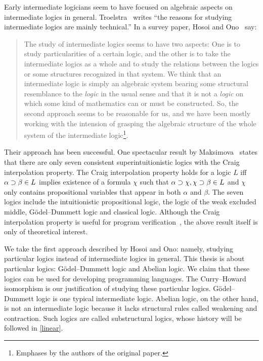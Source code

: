 Early intermediate logicians seem to have focused on algebraic aspects
on intermediate logics in general.
Troelstra~\cite[p.~223]{goedelcollected} writes ``the reasons
for studying intermediate logics are mainly technical.''
In a survey paper, Hosoi and Ono~\cite{hosoi-ono} say:
 \begin{quote}
  The study of intermediate logics seems to have two aspects: One is to
  study particularities of a certain logic, and the other is to take the
  intermediate logics as a whole and to study the relations between the
  logics or some structures recognized in that system.  We think that an
  intermediate logic is simply an algebraic system bearing some
  structural resemblance to the \textit{logic} in the usual sense and
  that it is not a \textit{logic} on which some kind of mathematics can
  or must be constructed.  So, the second approach seems to be
  reasonable for us, and we have been mostly working with the intension
  of grasping the algebraic structure of the whole system of the
  intermediate logic\footnote{Emphases by the authors of the original
  paper.}.
 \end{quote}
Their approach has been successful.
One spectacular result by Maksimova~\citep{maksimova77}
states that there are only seven consistent
superintuitionistic logics with the Craig interpolation
property.
The Craig interpolation property holds for a logic $L$ iff $\alpha
\supset\beta\in L$ implies existence of a formula $\chi$ such that
$\alpha\supset\chi, \chi\supset\beta\in L$ and $\chi$ only contains propositional
variables that appear in both $\alpha$ and $\beta$.
The seven logics include the intuitionistic propositional logic, the logic of
the weak excluded middle,
G\"odel--Dummett logic
and classical logic.
Although the Craig interpolation property is useful for program
verification~\citep{mcmillan2003,esparza,unno2009},
the above result itself is only of
theoretical interest.

We take the first approach described by Hosoi and Ono: namely,
studying particular logics instead of intermediate logics in general.
This thesis is about particular logics: G\"odel--Dummett logic and
Abelian logic.  We claim that these logics can be used for developing
 programming languages.  The Curry--Howard
isomorphism is our justification of studying these particular logics.
G\"odel--Dummett logic is one typical intermediate logic.
Abelian logic, on the other hand, is not an intermediate logic
because it lacks structural rules called weakening and contraction.  Such logics are
called substructural logics, whose history will be followed in \ref{linear}.

